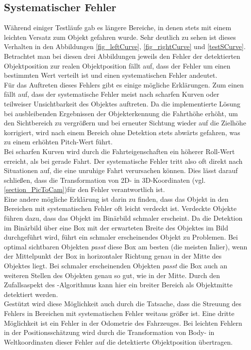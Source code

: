\subsection{Systematischer Fehler}
\label{sec_sysError}
Während einiger Testläufe gab es längere Bereiche, in denen stets mit einem leichten Versatz zum Objekt gefahren wurde. Sehr deutlich zu sehen ist dieses Verhalten in den Abbildungen \ref{fig_leftCurve}, \ref{fig_rightCurve} und \ref{testSCurve}. Betrachtet man bei diesen drei Abbildungen jeweils den Fehler der detektierten Objektposition zur realen Objektposition fällt auf, dass der Fehler um einen bestimmten Wert verteilt ist und einen systematischen Fehler andeutet.\\
Für das Auftreten dieses Fehlers gibt es einige mögliche Erklärungen.
Zum einen fällt auf, dass der systematische Fehler meist nach scharfen Kurven oder teilweiser Unsichtbarkeit des Objektes auftreten. Da die implementierte Lösung bei ausbleibenden Ergebnissen der Objekterkennung die Fahrthöhe erhöht, um den Sichtbereich zu vergrößern und bei erneuter Sichtung wieder auf die Zielhöhe korrigiert, wird nach einem Bereich ohne Detektion stets abwärts gefahren, was zu einem erhöhten Pitch-Wert führt.\\
Bei scharfen Kurven wird durch die Fahrteigenschaften ein höherer Roll-Wert erreicht, als bei gerade Fahrt.
Der systematische Fehler tritt also oft direkt nach Situationen auf, die eine unruhige Fahrt verursachen können. Dies lässt darauf schließen, dass die Transformation von 2D- in 3D-Koordinaten (vgl. \ref{section_PicToCam})für den Fehler verantwortlich ist.\\
Eine andere mögliche Erklärung ist darin zu finden, dass das Objekt in den Bereichen mit systematischen Fehler oft leicht verdeckt ist. Verdeckte Objekte führen dazu, dass das Objekt im Binärbild schmaler erscheint. Da die Detektion im Binärbild über eine Box mit der erwarteten Breite des Objektes im Bild durchgeführt wird, führt ein schmaler erscheinendes Objekt zu Problemen. Bei optimal sichtbaren Objekten \textit{passt} diese Box am besten (die meisten Inlier), wenn der Mittelpunkt der Box in horizontaler Richtung genau in der Mitte des Objektes liegt. Bei schmaler erscheinenden Objekten \textit{passt} die Box auch an weiteren Stellen des Objekten genau so gut, wie in der Mitte. Durch den Zufallsaspekt des \rans -Algorithmus kann hier ein breiter Bereich als Objektmitte detektiert werden.\\
Gestützt wird diese Möglichkeit auch durch die Tatsache, dass die Streuung des Fehlers in Bereichen mit systematischen Fehler weitaus größer ist.
Eine dritte Möglichkeit ist ein Fehler in der Odometrie des Fahrzeuges. Bei leichten Fehlern in der Positionsschätzung wird durch die Transformation von Body- in Weltkoordinaten dieser Fehler auf die detektierte Objektposition übertragen.

